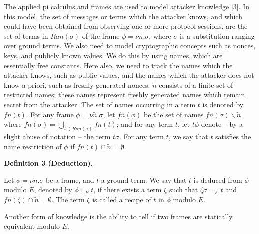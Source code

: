  
The applied pi calculus and frames are used to model attacker knowledge [3]. In this model, the set of messages or terms which the attacker knows, and which could have been obtained from observing one or more protocol sessions, are the set of terms in $Ran(\sigma)$ of the frame $\phi=\nu\tilde{n}.\sigma$, where $\sigma$ is a substitution ranging over ground terms. We also need to model cryptographic concepts such as nonces, keys, and publicly known values. We do this by using names, which are essentially free constants. Here also, we need to track the names which the attacker knows, such as public values, and the names which the attacker does not know a priori, such as freshly generated nonces. $\tilde{n}$ consists of a finite set of restricted names; these names represent freshly generated names which remain secret from the attacker. The set of names occurring in a term $t$ is denoted by $\mathit{fn}(t)$. For any frame $\phi=\nu\tilde{n}.\sigma$, let $\mathit{fn}(\phi)$ be the set of names $\mathit{fn}(\sigma)\backslash\tilde{n}$ where $\mathit{fn}(\sigma)=\bigcup_{t\in Ran(\sigma)}\mathit{fn}(t)$; and for any term $t$, let $t\phi$ denote – by a slight abuse of notation – the term $t\sigma$. For any term $t$, we say that $t$ satisfies the name restriction of $\phi$ if $\mathit{fn}(t)\cap\tilde{n}=\emptyset$.\par
 
 
 
\par\medskip\noindent\textbf{Definition 3 (Deduction).}\par
 
 
Let $\phi=\nu\tilde{n}.\sigma$ be a frame, and $t$ a ground term. We say that $t$ is deduced from $\phi$ modulo $E$, denoted by $\phi\vdash_{E}t$, if there exists a term $\zeta$ such that $\zeta\sigma=_{E}t$ and $\mathit{fn}(\zeta)\cap\tilde{n}=\emptyset$. The term $\zeta$ is called a recipe of $t$ in $\phi$ modulo $E$.\par
 
 
 
 
Another form of knowledge is the ability to tell if two frames are statically equivalent modulo $E$.\par
 
